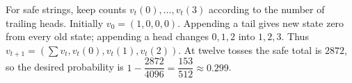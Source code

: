For safe strings, keep counts $v_t(0),\ldots,v_t(3)$ according to the number of trailing heads. Initially $v_0=(1,0,0,0)$. Appending a tail gives new state zero from every old state; appending a head changes $0,1,2$ into $1,2,3$. Thus $v_{t+1}=(\sum v_t,v_t(0),v_t(1),v_t(2))$. At twelve tosses the safe total is $2872$, so the desired probability is $1-\dfrac{2872}{4096}=\dfrac{153}{512}\approx\boxed{0.299}$.
